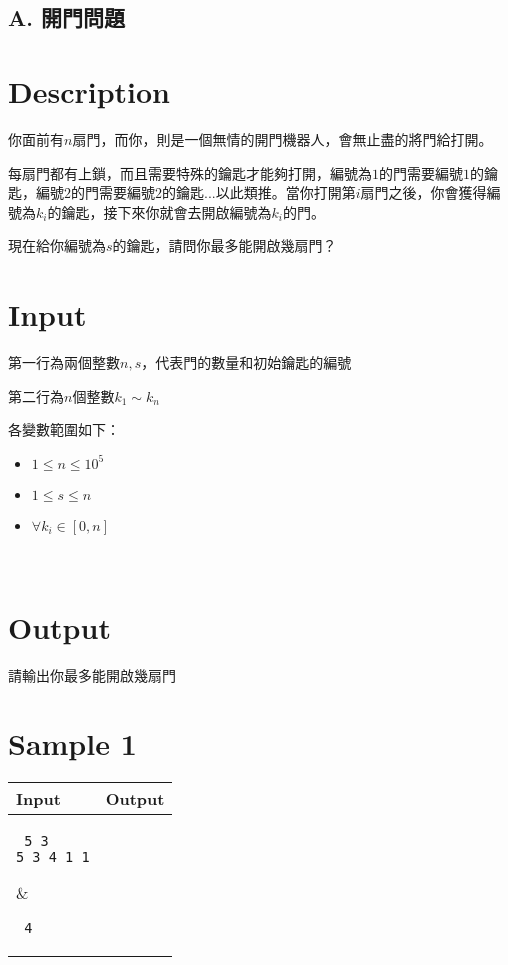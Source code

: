 \documentclass[11pt,a4paper]{article}
\begin{document}
\begin{center}
\section*{A. 開門問題}
\end{center}

\section*{Description}

你面前有$n$扇門，而你，則是一個無情的開門機器人，會無止盡的將門給打開。

每扇門都有上鎖，而且需要特殊的鑰匙才能夠打開，編號為$1$的門需要編號$1$的鑰匙，編號$2$的門需要編號$2$的鑰匙...以此類推。當你打開第$i$扇門之後，你會獲得編號為$k_i$的鑰匙，接下來你就會去開啟編號為$k_i$的門。

現在給你編號為$s$的鑰匙，請問你最多能開啟幾扇門？
	
\section*{Input}

第一行為兩個整數$n,s$，代表門的數量和初始鑰匙的編號

第二行為$n$個整數$k_1\sim k_n$

各變數範圍如下：
\begin{itemize}
    \item $1 \le n\le 10^5$
    \item $1\le s\le n$
    \item $\forall k_i\in [0,n]$
\end{itemize}\

\section*{Output}

請輸出你最多能開啟幾扇門

\section*{Sample 1}
\begin{longtable}[!h]{|p{}|p{}|}
\hline
\textbf {Input}	& \textbf {Output} \\
\hline
\parbox[t]{0.5\textwidth} %
{ \tt
5 3\\
5 3 4 1 1\\
} &
\parbox[t]{0.5\textwidth}
{ \tt
4\\
} \\
\hline
\end{longtable}
\end{document}
